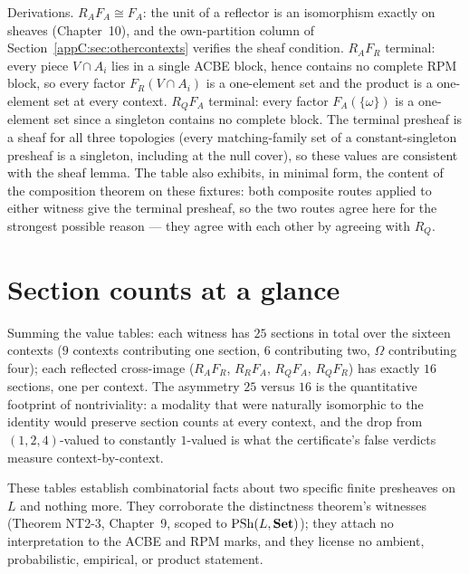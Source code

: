 Derivations. $R_A F_A \cong F_A$: the unit of a reflector is an
isomorphism exactly on sheaves (Chapter~10), and the own-partition
column of Section~\ref{appC:sec:othercontexts} verifies the sheaf
condition. $R_A F_R$ terminal: every piece $V \cap A_i$ lies in a
single ACBE block, hence contains no complete RPM block, so every
factor $F_R(V \cap A_i)$ is a one-element set and the product is a
one-element set at every context. $R_Q F_A$ terminal: every factor
$F_A(\{\omega\})$ is a one-element set since a singleton contains no
complete block. The terminal presheaf is a sheaf for all three
topologies (every matching-family set of a constant-singleton presheaf
is a singleton, including at the null cover), so these values are
consistent with the sheaf lemma. The table also exhibits, in minimal
form, the content of the composition theorem on these fixtures: both
composite routes applied to either witness give the terminal presheaf,
so the two routes agree here for the strongest possible reason ---
they agree with each other by agreeing with $R_Q$.

\section{Section counts at a glance}
\label{appC:sec:glance}

Summing the value tables: each witness has $25$ sections in total over
the sixteen contexts ($9$ contexts contributing one section, $6$
contributing two, $\Omega$ contributing four); each reflected
cross-image ($R_A F_R$, $R_R F_A$, $R_Q F_A$, $R_Q F_R$) has exactly
$16$ sections, one per context. The asymmetry $25$ versus $16$ is the
quantitative footprint of nontriviality: a modality that were
naturally isomorphic to the identity would preserve section counts at
every context, and the drop from $(1,2,4)$-valued to constantly
$1$-valued is what the certificate's false verdicts measure
context-by-context.

\begin{boundary}
\label{appC:bnd:scope}
These tables establish combinatorial facts about two specific finite
presheaves on $L$ and nothing more. They corroborate the distinctness
theorem's witnesses (Theorem NT2-3, Chapter~9, scoped to
$\mathrm{PSh}(L, \mathbf{Set})$); they
attach no interpretation to the ACBE and RPM marks, and they license
no ambient, probabilistic, empirical, or product statement.
\end{boundary}
